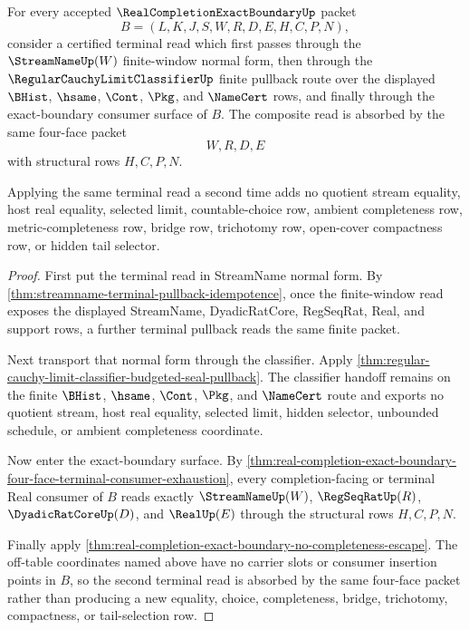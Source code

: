 \begin{theorem}
\label{thm:real-completion-exact-boundary-terminal-normal-form-absorption}
For every accepted $\RealCompletionExactBoundaryUp$ packet
$$
B=(L,K,J,S,W,R,D,E,H,C,P,N),
$$
consider a certified terminal read which first passes through the
$\StreamNameUp(W)$ finite-window normal form, then through the
$\RegularCauchyLimitClassifierUp$ finite pullback route over the displayed
$\BHist$, $\hsame$, $\Cont$, $\Pkg$, and $\NameCert$ rows, and finally through
the exact-boundary consumer surface of $B$. The composite read is absorbed by
the same four-face packet
$$
W,R,D,E
$$
with structural rows $H,C,P,N$.

Applying the same terminal read a second time adds no quotient stream equality,
host real equality, selected limit, countable-choice row, ambient completeness
row, metric-completeness row, bridge row, trichotomy row, open-cover
compactness row, or hidden tail selector.
\end{theorem}
\begin{proof}
First put the terminal read in StreamName normal form. By
\autoref{thm:streamname-terminal-pullback-idempotence}, once the finite-window
read exposes the displayed StreamName, DyadicRatCore, RegSeqRat, Real, and
support rows, a further terminal pullback reads the same finite packet.

Next transport that normal form through the classifier. Apply
\autoref{thm:regular-cauchy-limit-classifier-budgeted-seal-pullback}. The
classifier handoff remains on the finite $\BHist$, $\hsame$, $\Cont$, $\Pkg$,
and $\NameCert$ route and exports no quotient stream, host real equality,
selected limit, hidden selector, unbounded schedule, or ambient completeness
coordinate.

Now enter the exact-boundary surface. By
\autoref{thm:real-completion-exact-boundary-four-face-terminal-consumer-exhaustion},
every completion-facing or terminal Real consumer of $B$ reads exactly
$\StreamNameUp(W)$, $\RegSeqRatUp(R)$, $\DyadicRatCoreUp(D)$, and $\RealUp(E)$
through the structural rows $H,C,P,N$.

Finally apply
\autoref{thm:real-completion-exact-boundary-no-completeness-escape}. The
off-table coordinates named above have no carrier slots or consumer insertion
points in $B$, so the second terminal read is absorbed by the same four-face
packet rather than producing a new equality, choice, completeness, bridge,
trichotomy, compactness, or tail-selection row.
\end{proof}

